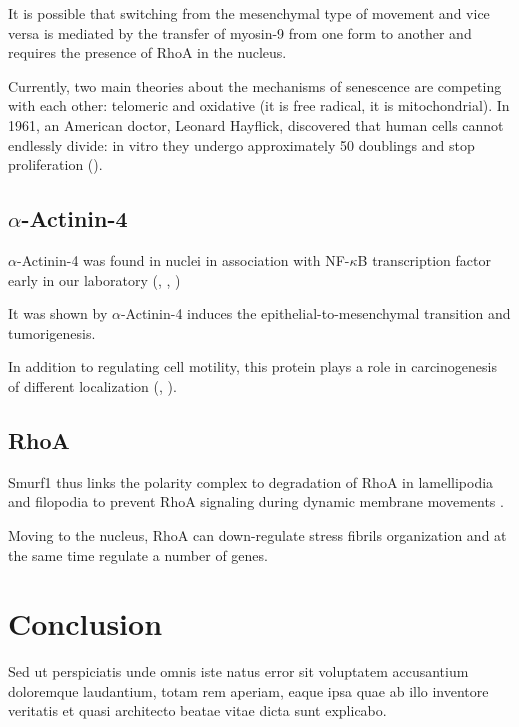 \documentclass[english,authoryear]{elsarticle}
\begin{document}
It is possible that switching from the mesenchymal type of movement and vice versa is mediated by the transfer of myosin-9 from one form to another and requires the presence of RhoA in the nucleus.

Currently, two main theories about the mechanisms of senescence are competing with each other: telomeric and oxidative (it is free radical, it is mitochondrial). In 1961, an American doctor, Leonard Hayflick, discovered that human cells cannot endlessly divide: in vitro they undergo approximately 50 doublings and stop proliferation (\cite{hayflick1961serial}).



\subsection*{$\alpha$-Actinin-4}

$\alpha$-Actinin-4 was found in nuclei in association with NF-$\kappa$B transcription factor early in our laboratory (\cite{babakov2008rela}, \cite{lomert2018co}, \cite{bolshakova2007extra})

It was shown by \cite{an2016alpha} $\alpha$-Actinin-4 induces the epithelial-to-mesenchymal transition and tumorigenesis.

In addition to regulating cell motility, this protein plays a role in carcinogenesis of different localization (\cite{barbolina2008motility}, \cite{hsu2013alpha}).

\subsection*{RhoA}

 Smurf1 thus links the polarity complex to degradation of RhoA in lamellipodia and filopodia to prevent RhoA signaling during dynamic membrane movements \cite{wang2003regulation}.

 Moving to the nucleus, RhoA can down-regulate stress fibrils organization and at the same time regulate a number of genes.


\section*{Conclusion}

Sed ut perspiciatis unde omnis iste natus error sit voluptatem accusantium doloremque laudantium, totam rem aperiam, eaque ipsa quae ab illo inventore veritatis et quasi architecto beatae vitae dicta sunt explicabo.
\end{document}
